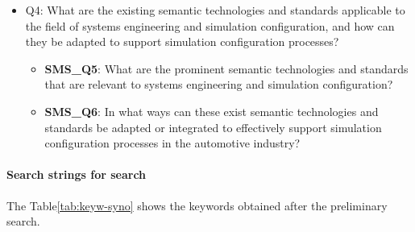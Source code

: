 \begin{itemize}
                \item Q4: What are the existing semantic technologies and standards applicable to the field of systems engineering and simulation configuration, and how can they be adapted to support simulation configuration processes?
                    \begin{itemize}
                        \item \textbf{SMS\_Q5}: What are the prominent semantic technologies and standards that are relevant to systems engineering and simulation configuration?

                        \item \textbf{SMS\_Q6}: In what ways can these exist semantic technologies and standards be adapted or integrated to effectively support simulation configuration processes in the automotive industry?
                    \end{itemize}

            \end{itemize}

            
            \paragraph{Search strings for search}
            The Table\ref{tab:keyw-syno} shows the keywords obtained after the preliminary search.\\

